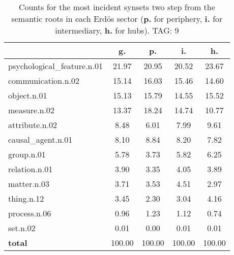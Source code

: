 \begin{table}[h!]
\begin{center}
\begin{tabular}{| l | c | c | c | c |}\hline
 & g. & p. & i. & h. \\\hline
psychological\_feature.n.01 & 21.97  & 20.95  & 20.52  & 23.67 \\\hline
communication.n.02 & 15.14  & 16.03  & 15.46  & 14.60 \\\hline
object.n.01 & 15.13  & 15.79  & 14.55  & 15.52 \\\hline
measure.n.02 & 13.37  & 18.24  & 14.74  & 10.77 \\\hline
attribute.n.02 & 8.48  & 6.01  & 7.99  & 9.61 \\\hline
causal\_agent.n.01 & 8.10  & 8.84  & 8.20  & 7.82 \\\hline
group.n.01 & 5.78  & 3.73  & 5.82  & 6.25 \\\hline
relation.n.01 & 3.90  & 3.35  & 4.05  & 3.89 \\\hline
matter.n.03 & 3.71  & 3.53  & 4.51  & 2.97 \\\hline
thing.n.12 & 3.45  & 2.30  & 3.04  & 4.16 \\\hline
process.n.06 & 0.96  & 1.23  & 1.12  & 0.74 \\\hline
set.n.02 & 0.01  & 0.00  & 0.01  & 0.01 \\\hline
{{\bf total}} & 100.00  & 100.00  & 100.00  & 100.00 \\\hline
\end{tabular}
\caption{Counts for the most incident synsets two step from the semantic roots in each Erd\"os sector ({\bf p.} for periphery, {\bf i.} for intermediary, {\bf h.} for hubs). TAG: 9}
\end{center}
\end{table}